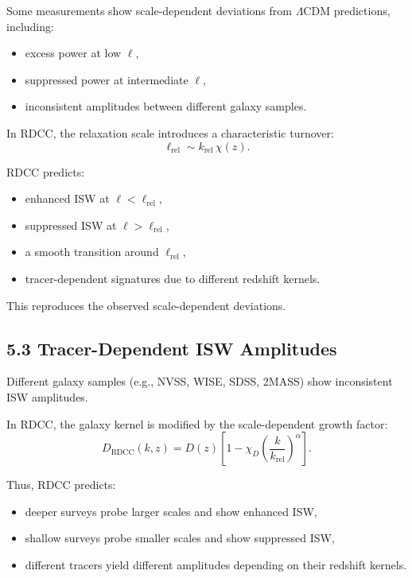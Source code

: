\documentclass[11pt,a4paper]{article}
\begin{document}
Some measurements show scale-dependent deviations from $\Lambda$CDM predictions, including:

\begin{itemize}
    \item excess power at low $\ell$,
    \item suppressed power at intermediate $\ell$,
    \item inconsistent amplitudes between different galaxy samples.
\end{itemize}

In RDCC, the relaxation scale introduces a characteristic turnover:
\begin{equation}
    \ell_{\mathrm{rel}}
    \sim k_{\mathrm{rel}}\,\chi(z).
\end{equation}

RDCC predicts:

\begin{itemize}
    \item enhanced ISW at $\ell < \ell_{\mathrm{rel}}$,
    \item suppressed ISW at $\ell > \ell_{\mathrm{rel}}$,
    \item a smooth transition around $\ell_{\mathrm{rel}}$,
    \item tracer-dependent signatures due to different redshift kernels.
\end{itemize}

This reproduces the observed scale-dependent deviations.

\subsection*{5.3 Tracer-Dependent ISW Amplitudes}

Different galaxy samples (e.g., NVSS, WISE, SDSS, 2MASS) show inconsistent ISW amplitudes.

In RDCC, the galaxy kernel is modified by the scale-dependent growth factor:
\begin{equation}
    D_{\mathrm{RDCC}}(k,z)
    = D(z)
      \left[
        1 - \chi_{D}
        \left(\frac{k}{k_{\mathrm{rel}}}\right)^{\alpha}
      \right].
\end{equation}

Thus, RDCC predicts:

\begin{itemize}
    \item deeper surveys probe larger scales and show enhanced ISW,
    \item shallow surveys probe smaller scales and show suppressed ISW,
    \item different tracers yield different amplitudes depending on their redshift kernels.
\end{itemize}
\end{document}
